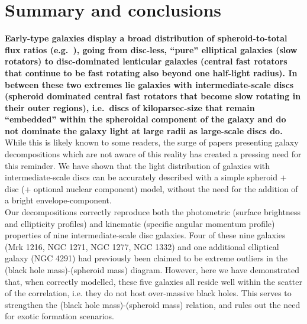 \documentclass[useAMS,usenatbib,article]{mnras}
\begin{document}
\section{Summary and conclusions}
{\bf Early-type galaxies display a broad distribution of spheroid-to-total flux ratios (e.g.~\citealt{cappellari2011}), 
going from disc-less, ``pure'' elliptical galaxies (slow rotators) 
to disc-dominated lenticular galaxies (central fast rotators that continue to be fast rotating also beyond one half-light radius). 
In between these two extremes lie galaxies with intermediate-scale discs 
(spheroid dominated central fast rotators that become slow rotating in their outer regions), 
i.e.~discs of kiloparsec-size that remain ``embedded'' within the spheroidal component of the galaxy 
and do not dominate the galaxy light at large radii as large-scale discs do. }
While this is likely known to some readers, 
the surge of papers presenting galaxy decompositions which are not aware of this reality 
has created a pressing need for this reminder. 
We have shown that the light distribution of galaxies with intermediate-scale discs can be accurately described 
with a simple spheroid + disc (+ optional nuclear component) model, 
without the need for the addition of a bright envelope-component. \\
Our decompositions correctly reproduce both the photometric (surface brightness and ellipticity profiles) 
and kinematic (specific angular momentum profile) properties of nine intermediate-scale disc galaxies. 
Four of these nine galaxies (Mrk 1216, NGC 1271, NGC 1277, NGC 1332) and one additional elliptical galaxy (NGC 4291) 
had previously been claimed to be extreme outliers in the (black hole mass)-(spheroid mass) diagram. 
However, here we have demonstrated that, when correctly modelled, 
these five galaxies all reside well within the scatter of the correlation, 
i.e. they do not host over-massive black holes. 
This serves to strengthen the (black hole mass)-(spheroid mass) relation, 
and rules out the need for exotic formation scenarios. 
\end{document}
